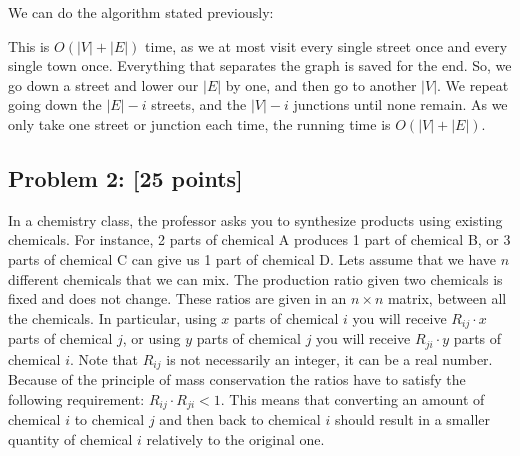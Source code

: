 \documentclass[11pt]{article}
\begin{document}
We can do the algorithm stated previously:


This is $O(|V| + |E|)$ time, as we at most visit every single street once and every single town once. Everything that separates the graph is saved for the end. So, we go down a street and lower our $|E|$ by one, and then go to another $|V|$. We repeat going down the $|E|-i$ streets, and the $|V|-i$ junctions until none remain. As we only take one street or junction each time, the running time is $O(|V| + |E|)$.


\subsection*{Problem 2: [25 points]} In a chemistry class, the
professor asks you to synthesize products using existing
chemicals. For instance, 2 parts of chemical A produces 1 part of
chemical B, or 3 parts of chemical C can give us 1 part of chemical
D. Lets assume that we have $n$ different chemicals that we can
mix. The production ratio given two chemicals is fixed and does not
change. These ratios are given in an $n \times n$ matrix, between all
the chemicals. In particular, using $x$ parts of chemical $i$ you will
receive $R_{ij} \cdot x$ parts of chemical $j$, or using $y$ parts of
chemical $j$ you will receive $R_{ji} \cdot y$ parts of chemical
$i$. Note that $R_{ij}$ is not necessarily an integer, it can be a
real number.\\

\noindent Because of the principle of mass conservation the ratios
have to satisfy the following requirement: $R_{ij} \cdot R_{ji} <
1$. This means that converting an amount of chemical $i$ to chemical
$j$ and then back to chemical $i$ should result in a smaller quantity
of chemical $i$ relatively to the original one.\\
\end{document}

